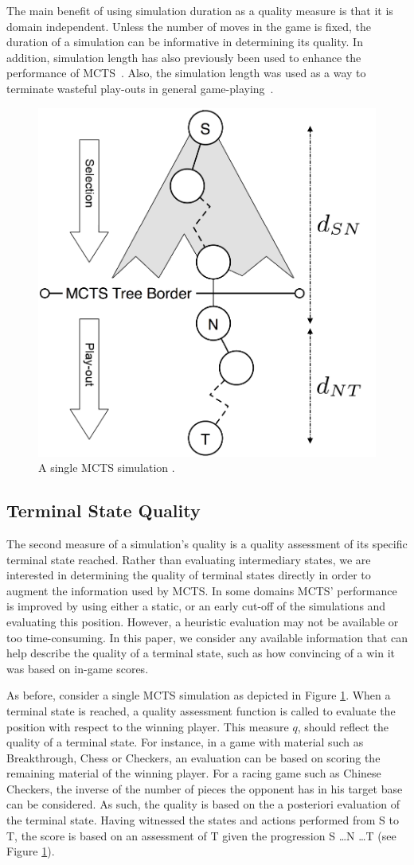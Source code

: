 \documentclass{ecai2014}
\newcommand{\node}[1]{{\fontfamily{phv}\selectfont#1}}
\begin{document}
The main benefit of using simulation duration as a quality measure is that it is domain independent. Unless the number of moves in the game is fixed, the duration of a simulation can be informative in determining its quality. In addition, simulation length has also previously been used to enhance the performance of MCTS~\cite{Enzenberger10Fuego,keller13thts,roschke2013cc}. Also, the simulation length was used as a way to terminate wasteful play-outs in general game-playing~\cite{finnsson2012generalized}.
\begin{figure}[t]
	\centering
	\includegraphics[width=.27\textwidth]{img/figure2_new.png}
	\caption{A single MCTS simulation \cite{finnsson2012generalized}.}
	\label{fig:mcts-simulation}
\end{figure}
\subsection{Terminal State Quality}
\label{sub:termqual}

The second measure of a simulation's quality is a quality assessment of its specific terminal state reached. Rather than evaluating intermediary states, we are interested in determining the quality of terminal states directly in order to augment the information used by MCTS. In some domains MCTS' performance is improved by using either a static, or an early cut-off of the simulations and evaluating this position. However, a heuristic evaluation may not be available or too time-consuming. In this paper, we consider any available information that can help describe the quality of a terminal state, such as how convincing of a win it was based on in-game scores.  

As before, consider a single MCTS simulation as depicted in Figure \ref{fig:mcts-simulation}. When a terminal state is reached, a quality assessment function is called to evaluate the position with respect to the winning player. This measure $q$, should reflect the quality of a terminal state. For instance, in a game with material such as Breakthrough, Chess or Checkers, an evaluation can be based on scoring the remaining material of the winning player. For a racing game such as Chinese Checkers, the inverse of the number of pieces the opponent has in his target base can be considered. As such, the quality is based on the a posteriori evaluation of the terminal state. Having witnessed the states and actions performed from \node{S} to \node{T}, the score is based on an assessment of \node{T} given the progression \node{S} \ldots \node{N} \ldots \node{T} (see Figure \ref{fig:mcts-simulation}).
\end{document}
